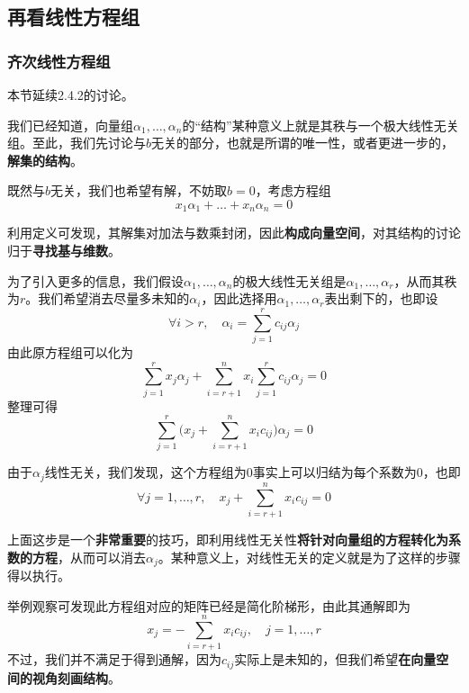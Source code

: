 \documentclass[a4paper,UTF8,fontset=windows]{ctexart}
\newcommand*{\note}{\noindent *}
\begin{document}
\subsection{再看线性方程组}
\subsubsection{齐次线性方程组}
本节延续2.4.2的讨论。

我们已经知道，向量组$\alpha_1,\dots,\alpha_n$的``结构''某种意义上就是其秩与一个极大线性无关组。至此，我们先讨论与$b$无关的部分，也就是所谓的唯一性，或者更进一步的，\textbf{解集的结构}。

既然与$b$无关，我们也希望有解，不妨取$b=0$，考虑方程组
$$x_1\alpha_1+\dots+x_n\alpha_n=0$$

利用定义可发现，其解集对加法与数乘封闭，因此\textbf{构成向量空间}，对其结构的讨论归于\textbf{寻找基与维数}。

为了引入更多的信息，我们假设$\alpha_1,\dots,\alpha_n$的极大线性无关组是$\alpha_1,\dots,\alpha_r$，从而其秩为$r$。我们希望消去尽量多未知的$\alpha_i$，因此选择用$\alpha_1,\dots,\alpha_r$表出剩下的，也即设
$$\forall i>r,\quad\alpha_i=\sum_{j=1}^rc_{ij}\alpha_j$$
由此原方程组可以化为
$$\sum_{j=1}^rx_j\alpha_j+\sum_{i=r+1}^nx_i\sum_{j=1}^rc_{ij}\alpha_j=0$$
整理可得
$$\sum_{j=1}^r\bigg(x_j+\sum_{i=r+1}^nx_ic_{ij}\bigg)\alpha_j=0$$

由于$\alpha_j$线性无关，我们发现，这个方程组为0事实上可以归结为每个系数为0，也即
$$\forall j=1,\dots,r,\quad x_j+\sum_{i=r+1}^nx_ic_{ij}=0$$

\note 上面这步是一个\textbf{非常重要}的技巧，即利用线性无关性\textbf{将针对向量组的方程转化为系数的方程}，从而可以消去$\alpha_j$。某种意义上，对线性无关的定义就是为了这样的步骤得以执行。

举例观察可发现此方程组对应的矩阵已经是简化阶梯形，由此其通解即为
$$x_j=-\sum_{i=r+1}^nx_ic_{ij},\quad j=1,\dots,r$$
不过，我们并不满足于得到通解，因为$c_{ij}$实际上是未知的，但我们希望\textbf{在向量空间的视角刻画结构}。
\end{document}
